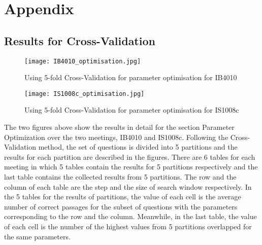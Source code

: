 \chapter*{Appendix}

\section{Results for Cross-Validation}


\begin{figure}[hb!]
\centering
\texttt{[image: IB4010\_optimisation.jpg]}
\caption{Using 5-fold Cross-Validation for parameter optimisation for IB4010}
\label{Using 5-fold Cross-Validation for parameter optimisation for IB4010}
\end{figure}

\pagebreak


\begin{figure}[hb!]
\centering
\texttt{[image: IS1008c\_optimisation.jpg]}
\caption{Using 5-fold Cross-Validation for parameter optimisation for IS1008c}
\label{Using 5-fold Cross-Validation for parameter optimisation for IS1008c}
\end{figure}

The two figures above show the results in detail for the section Parameter Optimization over the two meetings, IB4010 and IS1008c. Following the Cross-Validation method, the set of questions is divided into 5 partitions and the results for each partition are described in the figures. There are 6 tables for each meeting in which 5 tables contain the results for 5 partitions respectively and the last table contains the collected results from 5 partitions. The row and the column of each table are the step and the size of search window respectively. In the 5 tables for the results of partitions, the value of each cell is the average number of correct passages for the subset of questions with the parameters corresponding to the row and the column. Meanwhile, in the last table, the value of each cell is the number of the highest values from 5 partitions overlapped for the same parameters.


